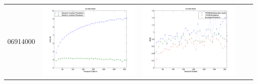 \documentclass[11pt]{article}
\begin{document}
\begin{table}[H]
{\begin{tabular}{c  c   c   c  c }
06914000&\begin{minipage}{.4\textwidth}\includegraphics[width=\linewidth]{resultgraph/06914000e.png}\end{minipage} 
&\begin{minipage}{.4\textwidth}\includegraphics[width=\linewidth]{resultgraph/06914000MI.png}\end{minipage}

\end{tabular}}
\end{table}
\end{document}
